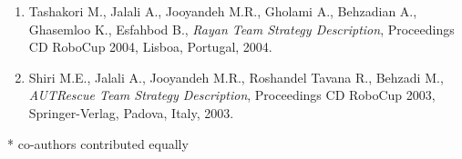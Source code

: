 \documentclass[11pt,a4paper,sans]{moderncv} %
\begin{document}
\begin{enumerate}
\item Tashakori M., Jalali A., Jooyandeh M.R., Gholami A., Behzadian A., Ghasemloo K., Esfahbod B., \emph{Rayan Team Strategy Description}, Proceedings CD RoboCup 2004, Lisboa, Portugal, 2004.
  
\item Shiri M.E., Jalali A., Jooyandeh M.R., Roshandel Tavana R., Behzadi M., \emph{AUTRescue Team Strategy Description}, Proceedings CD RoboCup 2003, Springer-Verlag, Padova, Italy, 2003. 
\end{enumerate}

\vspace{.5cm}
\small{* co-authors contributed equally}











\end{document}
